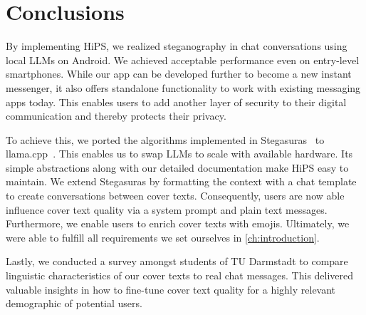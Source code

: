 
\chapter{Conclusions}\label{ch:conclusions}
\glsresetall %

By implementing \gls{HiPS}, we realized steganography in chat conversations using local \glspl{LLM} on Android. We achieved acceptable performance even on entry-level smartphones. While our app can be developed further to become a new instant messenger, it also offers standalone functionality to work with existing messaging apps today. This enables users to add another layer of security to their digital communication and thereby protects their privacy.

To achieve this, we ported the algorithms implemented in Stegasuras~\cite{zieglerNeuralLinguisticSteganography2019} to llama.cpp~\cite{gerganovGgerganovLlamacpp2024}. This enables us to swap \glspl{LLM} to scale with available hardware. Its simple abstractions along with our detailed documentation make \gls{HiPS} easy to maintain. We extend Stegasuras by formatting the context with a chat template to create conversations between cover texts. Consequently, users are now able influence cover text quality via a system prompt and plain text messages. Furthermore, we enable users to enrich cover texts with emojis. Ultimately, we were able to fulfill all requirements we set ourselves in \cref{ch:introduction}.

Lastly, we conducted a survey amongst students of TU Darmstadt to compare linguistic characteristics of our cover texts to real chat messages. This delivered valuable insights in how to fine-tune cover text quality for a highly relevant demographic of potential users.
